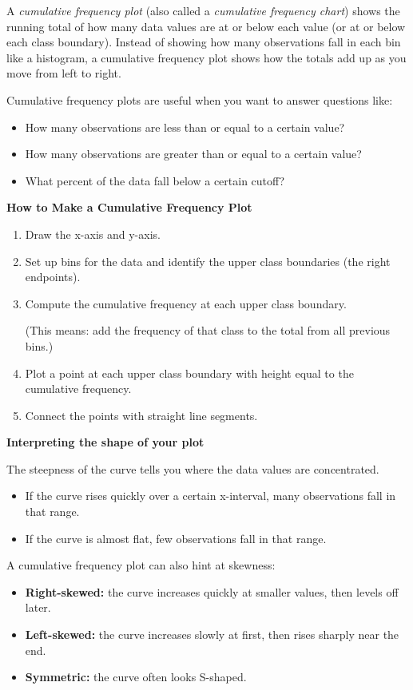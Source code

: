 A \textit{cumulative frequency plot} (also called a \textit{cumulative frequency chart})
shows the running total of how many data values are at or below each value (or at or below each class boundary).
Instead of showing how many observations fall in each bin like a histogram, a cumulative frequency plot shows
how the totals add up as you move from left to right.

Cumulative frequency plots are useful when you want to answer questions like:
\begin{itemize}
    \item How many observations are less than or equal to a certain value?
    \item How many observations are greater than or equal to a certain value?
    \item What percent of the data fall below a certain cutoff?
\end{itemize}

\textbf{How to Make a Cumulative Frequency Plot}
\begin{enumerate}
    \item Draw the x-axis and y-axis.
    \item Set up bins for the data and identify the upper class boundaries (the right endpoints).
    \item Compute the cumulative frequency at each upper class boundary.

    (This means: add the frequency of that class to the total from all previous bins.)
    \item Plot a point at each upper class boundary with height equal to the cumulative frequency.
    \item Connect the points with straight line segments.
\end{enumerate}

\textbf{Interpreting the shape of your plot}

The steepness of the curve tells you where the data values are concentrated.
\begin{itemize}
    \item If the curve rises quickly over a certain x-interval, many observations fall in that range.
    \item If the curve is almost flat, few observations fall in that range.
\end{itemize}

A cumulative frequency plot can also hint at skewness:
\begin{itemize}
    \item \textbf{Right-skewed:} the curve increases quickly at smaller values, then levels off later.
    \item \textbf{Left-skewed:} the curve increases slowly at first, then rises sharply near the end.
    \item \textbf{Symmetric:} the curve often looks S-shaped.
\end{itemize}

